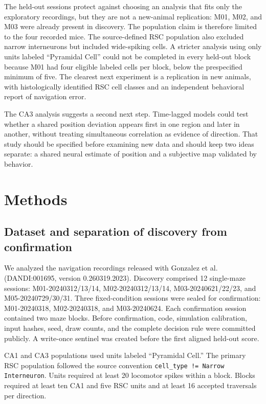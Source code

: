 \documentclass[10pt,twocolumn]{article}
\begin{document}
The held-out sessions protect against choosing an analysis that fits only the exploratory recordings, but they are not a new-animal replication: M01, M02, and M03 were already present in discovery. The population claim is therefore limited to the four recorded mice. The source-defined RSC population also excluded narrow interneurons but included wide-spiking cells. A stricter analysis using only units labeled ``Pyramidal Cell'' could not be completed in every held-out block because M01 had four eligible labeled cells per block, below the prespecified minimum of five. The clearest next experiment is a replication in new animals, with histologically identified RSC cell classes and an independent behavioral report of navigation error.

The CA3 analysis suggests a second next step. Time-lagged models could test whether a shared position deviation appears first in one region and later in another, without treating simultaneous correlation as evidence of direction. That study should be specified before examining new data and should keep two ideas separate: a shared neural estimate of position and a subjective map validated by behavior.

\section{Methods}

\subsection{Dataset and separation of discovery from confirmation}

We analyzed the navigation recordings released with Gonzalez et al. \citep{gonzalez2026} (DANDI:001695, version 0.260319.2023). Discovery comprised 12 single-maze sessions: M01-20240312/13/14, M02-20240312/13/14, M03-20240621/22/23, and M05-20240729/30/31. Three fixed-condition sessions were sealed for confirmation: M01-20240318, M02-20240318, and M03-20240624. Each confirmation session contained two maze blocks. Before confirmation, code, simulation calibration, input hashes, seed, draw counts, and the complete decision rule were committed publicly. A write-once sentinel was created before the first aligned held-out score.

CA1 and CA3 populations used units labeled ``Pyramidal Cell.'' The primary RSC population followed the source convention \texttt{cell\_type != Narrow Interneuron}. Units required at least 20 locomotor spikes within a block. Blocks required at least ten CA1 and five RSC units and at least 16 accepted traversals per direction.
\end{document}
